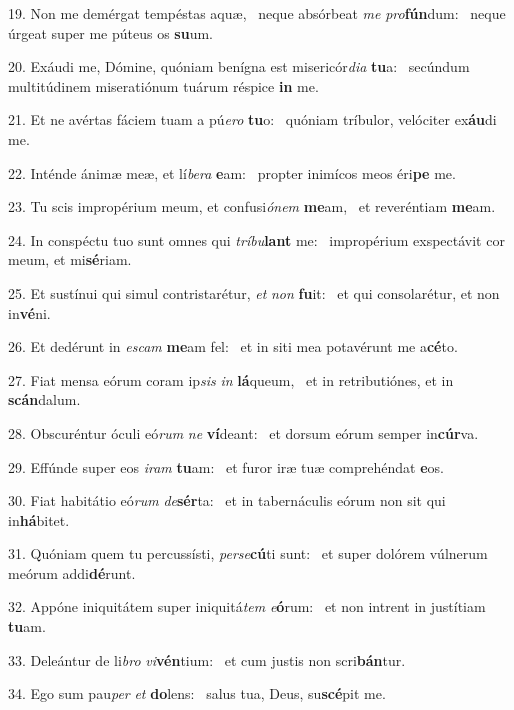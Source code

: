 19. Non me demérgat tempéstas aquæ, \dag\  neque absórbeat \textit{me} \textit{pro}\textbf{fún}dum: \ast\  neque úrgeat super me púteus os \textbf{su}um.\

20. Exáudi me, Dómine, quóniam benígna est misericór\textit{di}\textit{a} \textbf{tu}a: \ast\  secúndum multitúdinem miseratiónum tuárum réspice \textbf{in} me.\

21. Et ne avértas fáciem tuam a pú\textit{e}\textit{ro} \textbf{tu}o: \ast\  quóniam tríbulor, velóciter ex\textbf{áu}di me.\

22. Inténde ánimæ meæ, et lí\textit{be}\textit{ra} \textbf{e}am: \ast\  propter inimícos meos éri\textbf{pe} me.\

23. Tu scis impropérium meum, et confusi\textit{ó}\textit{nem} \textbf{me}am, \ast\  et reveréntiam \textbf{me}am.\

24. In conspéctu tuo sunt omnes qui \textit{trí}\textit{bu}\textbf{lant} me: \ast\  impropérium exspectávit cor meum, et mi\textbf{sé}riam.\

25. Et sustínui qui simul contristarétur, \textit{et} \textit{non} \textbf{fu}it: \ast\  et qui consolarétur, et non in\textbf{vé}ni.\

26. Et dedérunt in \textit{es}\textit{cam} \textbf{me}am fel: \ast\  et in siti mea potavérunt me a\textbf{cé}to.\

27. Fiat mensa eórum coram ip\textit{sis} \textit{in} \textbf{lá}queum, \ast\  et in retributiónes, et in \textbf{scán}dalum.\

28. Obscuréntur óculi eó\textit{rum} \textit{ne} \textbf{ví}deant: \ast\  et dorsum eórum semper in\textbf{cúr}va.\

29. Effúnde super eos \textit{i}\textit{ram} \textbf{tu}am: \ast\  et furor iræ tuæ comprehéndat \textbf{e}os.\

30. Fiat habitátio eó\textit{rum} \textit{de}\textbf{sér}ta: \ast\  et in tabernáculis eórum non sit qui in\textbf{há}bitet.\

31. Quóniam quem tu percussísti, \textit{per}\textit{se}\textbf{cú}ti sunt: \ast\  et super dolórem vúlnerum meórum addi\textbf{dé}runt.\

32. Appóne iniquitátem super iniquitá\textit{tem} \textit{e}\textbf{ó}rum: \ast\  et non intrent in justítiam \textbf{tu}am.\

33. Deleántur de li\textit{bro} \textit{vi}\textbf{vén}tium: \ast\  et cum justis non scri\textbf{bán}tur.\

34. Ego sum pau\textit{per} \textit{et} \textbf{do}lens: \ast\  salus tua, Deus, su\textbf{scé}pit me.\

